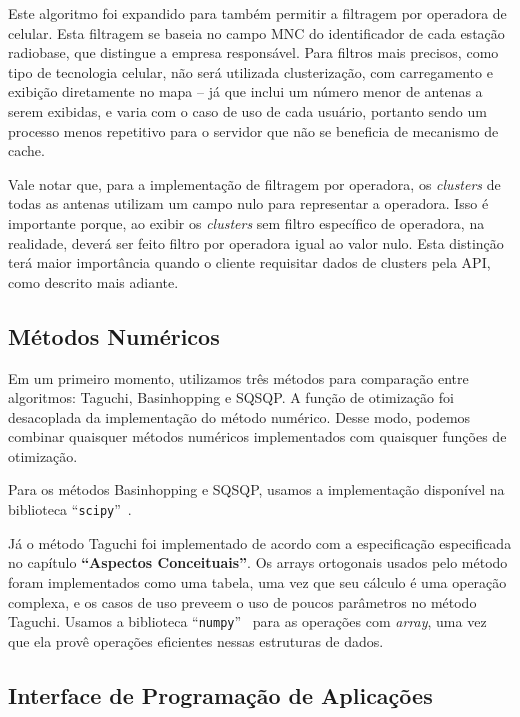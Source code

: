 \documentclass[]{politex}
\begin{document}
Este algoritmo foi expandido para também permitir a filtragem por operadora de
celular. Esta filtragem se baseia no campo MNC do identificador de cada estação
radiobase, que distingue a empresa responsável. Para filtros mais precisos, como
tipo de tecnologia celular, não será utilizada clusterização, com carregamento e
exibição diretamente no mapa -- já que inclui um número menor de antenas a serem
exibidas, e varia com o caso de uso de cada usuário, portanto sendo um processo
menos repetitivo para o servidor que não se beneficia de mecanismo de cache.

Vale notar que, para a implementação de filtragem por operadora, os \textit{clusters}
de todas as antenas utilizam um campo nulo para representar a operadora. Isso é
importante porque, ao exibir os \textit{clusters} sem filtro específico de operadora, na
realidade, deverá ser feito filtro por operadora igual ao valor nulo. Esta
distinção terá maior importância quando o cliente requisitar dados de clusters
pela API, como descrito mais adiante.

\subsection{Métodos Numéricos}

Em um primeiro momento, utilizamos três métodos para comparação entre
algoritmos: Taguchi, Basinhopping e SQSQP. A função de otimização foi
desacoplada da implementação do método numérico. Desse modo, podemos combinar
quaisquer métodos numéricos implementados com quaisquer funções de otimização.

Para os métodos Basinhopping e SQSQP, usamos a implementação disponível na
biblioteca ``\texttt{scipy}''~\cite{scipy}.

Já o método Taguchi foi implementado de acordo com a especificação especificada
no capítulo \textbf{``Aspectos Conceituais''}. Os arrays ortogonais usados pelo
método foram implementados como uma tabela, uma vez que seu cálculo é uma
operação complexa, e os casos de uso preveem o uso de poucos parâmetros no
método Taguchi. Usamos a biblioteca ``\texttt{numpy}''~\cite{numpy} para as operações com
\textit{array}, uma vez que ela provê operações eficientes nessas estruturas de dados.


\subsection{Interface de Programação de Aplicações}
\end{document}
